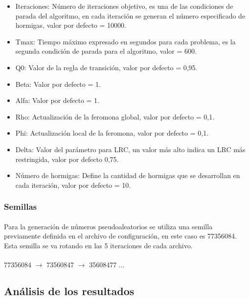 			\begin{itemize}
				\item Iteraciones: Número de iteraciones objetivo, es una de las condiciones de parada del algoritmo, en cada iteración se generan el número
				especificado de hormigas, valor por defecto = 10000.
				\item Tmax: Tiempo máximo expresado en segundos para cada problema, es la segunda condición de parada para el algoritmo, valor = 600.
				\item Q0: Valor de la regla de transición, valor por defecto = 0,95.
				\item Beta: Valor por defecto = 1.
				\item Alfa: Valor por defecto = 1.
				\item Rho: Actualización de la feromona global, valor por defecto = 0,1.
				\item Phi: Actualización local de la feromona, valor por defecto = 0,1.
				\item Delta: Valor del parámetro para LRC, un valor más alto indica un LRC más restringida, valor por defecto 0,75.
				\item Número de hormigas: Define la cantidad de hormigas que se desarrollan en cada iteración, valor por defecto = 10.
				
				
				
				
			\end{itemize}

	
	\subsubsection{Semillas}
	
	\paragraph{}Para la generación de números pseudoaleatorios se utiliza una semilla previamente definida en el archivo de configuración, en este caso es 77356084. Esta semilla se va rotando en las 5 iteraciones de cada archivo.
	
	
	\paragraph{} 77356084 $\rightarrow$ 73560847 $\rightarrow$ 35608477  ...
	
	
	\subsection{Análisis de los resultados}
	
